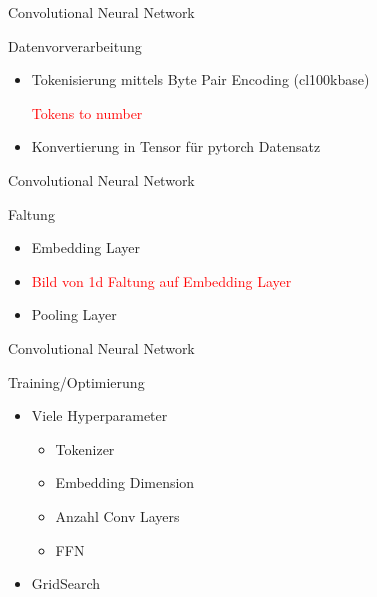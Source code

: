 \documentclass[aspectratio=169]{beamer} %
\begin{document}
\begin{frame}{Convolutional Neural Network}
    \begin{block}{Datenvorverarbeitung}
        \begin{itemize}
            \item Tokenisierung mittels Byte Pair Encoding (cl100kbase)

            

            \textcolor{red}{Tokens to number}
    
            \item Konvertierung in Tensor f\"ur pytorch Datensatz 
        \end{itemize}
    \end{block}
\end{frame}

\begin{frame}{Convolutional Neural Network}
    \begin{block}{Faltung}
        \begin{itemize}
            \item Embedding Layer
        
            \item \textcolor{red}{Bild von 1d Faltung auf Embedding Layer}

            \item Pooling Layer
        \end{itemize}
    \end{block}
\end{frame}

\begin{frame}{Convolutional Neural Network}
    \begin{block}{Training/Optimierung}
        \begin{itemize}
            \item Viele Hyperparameter
            \begin{itemize}
                \item Tokenizer

                \item Embedding Dimension

                \item Anzahl Conv Layers

                \item FFN
            \end{itemize}
            
            \item GridSearch
        \end{itemize}
    \end{block}
\end{frame}
\end{document}
